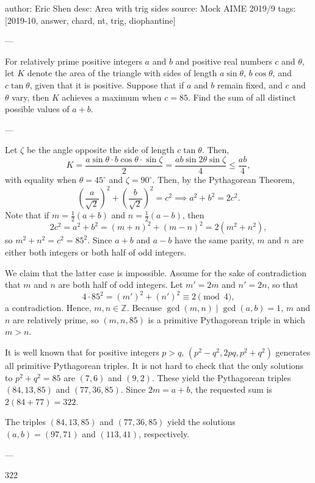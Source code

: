 author: Eric Shen
desc: Area with trig sides
source: Mock AIME 2019/9
tags: [2019-10, answer, chard, nt, trig, diophantine]

---

For relatively prime positive integers $a$ and $b$ and positive real numbers $c$ and $\theta$, let $K$ denote the area of the triangle with sides of length $a\sin\theta$, $b\cos\theta$, and $c\tan\theta$, given that it is positive. Suppose that if $a$ and $b$ remain fixed, and $c$ and $\theta$ vary, then $K$ achieves a maximum when $c=85$. Find the sum of all distinct possible values of $a+b$.

---

Let $\zeta$ be the angle opposite the side of length $c\tan\theta$. Then, \[K=\frac{a\sin\theta\cdot b\cos\theta\cdot\sin\zeta}2=\frac{ab\sin 2\theta\sin\zeta}4\le\frac{ab}4,\]
with equality when $\theta=45^\circ$ and $\zeta=90^\circ$.  Then, by the Pythagorean Theorem, \[\left(\frac a{\sqrt2}\right)^2+\left(\frac b{\sqrt 2}\right)^2=c^2\implies a^2+b^2=2c^2.\]
Note that if $m=\tfrac12(a+b)$ and $n=\tfrac12(a-b)$, then \[2c^2=a^2+b^2=(m+n)^2+(m-n)^2=2(m^2+n^2),\]
so $m^2+n^2=c^2=85^2$. Since $a+b$ and $a-b$ have the same parity, $m$ and $n$ are either both integers or both half of odd integers.

We claim that the latter case is impossible. Assume for the sake of contradiction that $m$ and $n$ are both half of odd integers. Let $m'=2m$ and $n'=2n$, so that \[4\cdot 85^2=(m')^2+(n')^2\equiv 2\pmod4,\]
a contradiction. Hence, $m,n\in\mathbb Z$. Because $\gcd(m,n)\mid\gcd(a,b)=1$, $m$ and $n$ are relatively prime, so $(m,n,85)$ is a primitive Pythagorean triple in which $m>n$.

It is well known that for positive integers $p>q$, $(p^2-q^2,2pq,p^2+q^2)$ generates all primitive Pythagorean triples. It is not hard to check that the only solutions to $p^2+q^2=85$ are $(7,6)$ and $(9,2)$. These yield the Pythagorean triples $(84,13,85)$ and $(77,36,85)$. Since $2m=a+b$, the requested sum is $2(84+77)=322$.
\begin{remark}
    The triples $(84,13,85)$ and $(77,36,85)$ yield the solutions $(a,b)=(97,71)$ and $(113,41)$, respectively.
\end{remark}

---

322
